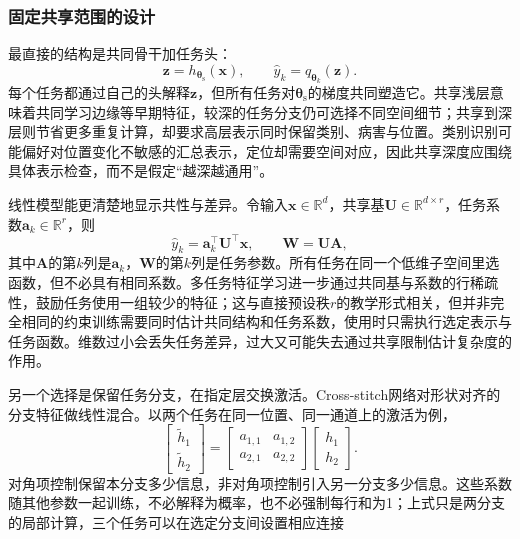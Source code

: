 \subsubsection{固定共享范围的设计}
\label{sec:ket-sharing-fixed}

最直接的结构是共同骨干加任务头：
\begin{equation}
  \bm z=h_{\bm{\theta}_{\mathrm{s}}}(\bm x),
  \qquad
  \hat y_k=q_{\bm{\theta}_k}(\bm z).
  \label{eq:ket-sharing-backbone}
\end{equation}
每个任务都通过自己的头解释$\bm z$，但所有任务对$\bm{\theta}_{\mathrm{s}}$的梯度共同塑造它。共享浅层意味着共同学习边缘等早期特征，较深的任务分支仍可选择不同空间细节；共享到深层则节省更多重复计算，却要求高层表示同时保留类别、病害与位置。类别识别可能偏好对位置变化不敏感的汇总表示，定位却需要空间对应，因此共享深度应围绕具体表示检查，而不是假定“越深越通用”。

线性模型能更清楚地显示共性与差异。令输入$\bm x\in\mathbb R^d$，共享基$\bm U\in\mathbb R^{d\times r}$，任务系数$\bm a_k\in\mathbb R^r$，则
\begin{equation}
  \hat y_k=\bm a_k^{\top}\bm U^{\top}\bm x,
  \qquad
  \bm W=\bm U\bm A,
  \label{eq:ket-sharing-subspace}
\end{equation}
其中$\bm A$的第$k$列是$\bm a_k$，$\bm W$的第$k$列是任务参数。所有任务在同一个低维子空间里选函数，但不必具有相同系数。多任务特征学习进一步通过共同基与系数的行稀疏性，鼓励任务使用一组较少的特征；这与直接预设秩$r$的教学形式相关，但并非完全相同的约束训练需要同时估计共同结构和任务系数，使用时只需执行选定表示与任务函数。维数过小会丢失任务差异，过大又可能失去通过共享限制估计复杂度的作用。

另一个选择是保留任务分支，在指定层交换激活。Cross-stitch网络对形状对齐的分支特征做线性混合。以两个任务在同一位置、同一通道上的激活为例，
\begin{equation}
  \begin{bmatrix}
    \widetilde h_1\\ \widetilde h_2
  \end{bmatrix}
  =
  \begin{bmatrix}
    a_{1,1}&a_{1,2}\\a_{2,1}&a_{2,2}
  \end{bmatrix}
  \begin{bmatrix}
    h_1\\h_2
  \end{bmatrix}.
  \label{eq:ket-sharing-cross-stitch}
\end{equation}
对角项控制保留本分支多少信息，非对角项控制引入另一分支多少信息。这些系数随其他参数一起训练，不必解释为概率，也不必强制每行和为1；上式只是两分支的局部计算，三个任务可以在选定分支间设置相应连接

